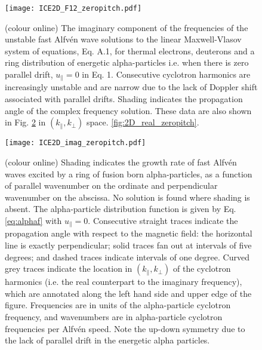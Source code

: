 \documentclass[12pt]{iopart}
\begin{document}
\begin{figure}[ht!]
    \centering
\texttt{[image: ICE2D\_F12\_zeropitch.pdf]}
    \caption{(colour online) The imaginary component of the frequencies of the unstable fast Alfv{\'e}n wave solutions to the linear Maxwell-Vlasov system of equations, Eq. A.1, for thermal electrons, deuterons and a ring distribution of energetic alpha-particles i.e. when there is zero parallel drift, $u_\parallel=0$ in Eq. 1. Consecutive cyclotron harmonics are increasingly unstable and are narrow due to the lack of Doppler shift associated with parallel drifts. Shading indicates the propagation angle of the complex frequency solution. These data are also shown in Fig. \ref{fig:2D_imag_zeropitch} in $(k_\parallel,k_\perp)$ space. \ref{fig:2D_real_zeropitch}.}
    \label{fig:2D_F12_zeropitch}
\end{figure}


\begin{figure}[ht!]
    \centering
\texttt{[image: ICE2D\_imag\_zeropitch.pdf]}
    \caption{(colour online) Shading indicates the growth rate of fast Alfv{\'e}n waves excited by a ring of fusion born alpha-particles, as a function of parallel wavenumber on the ordinate and perpendicular wavenumber on the abscissa. No solution is found where shading is absent. The alpha-particle distribution function is given by Eq. \ref{eq:alphaf} with $u_{\parallel} = 0$. Consecutive straight traces indicate the propagation angle with respect to the magnetic field: the horizontal line is exactly perpendicular; solid traces fan out at intervals of five degrees; and dashed traces indicate intervals of one degree. Curved grey traces indicate the location in $(k_\parallel, k_\perp)$ of the cyclotron harmonics (i.e. the real counterpart to the imaginary frequency), which are annotated along the left hand side and upper edge of the figure. Frequencies are in units of the alpha-particle cyclotron frequency, and wavenumbers are in alpha-particle cyclotron frequencies per Alfv{\'e}n speed. Note the up-down symmetry due to the lack of parallel drift in the energetic alpha particles.}
    \label{fig:2D_imag_zeropitch}
\end{figure}
\end{document}
